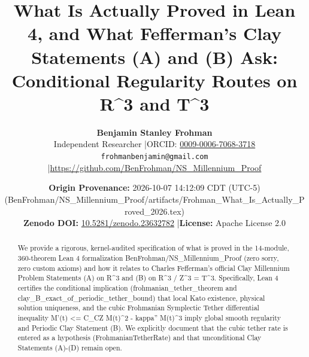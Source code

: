 \documentclass[11pt,letterpaper]{article}
\title{\textbf{What Is Actually Proved in Lean 4, and What Fefferman's Clay Statements (A) and (B) Ask: Conditional Regularity Routes on R\textasciicircum{}3 and T\textasciicircum{}3}}
\author{\textbf{Benjamin Stanley Frohman}\\
Independent Researcher \quad|\quad ORCID: \href{https://orcid.org/0009-0006-7068-3718}{0009-0006-7068-3718}\\
\texttt{frohmanbenjamin@gmail.com} \quad|\quad \url{https://github.com/BenFrohman/NS_Millennium_Proof}}
\date{\textbf{Origin Provenance:} 2026-10-07 14:12:09 CDT (UTC-5) (BenFrohman/NS\_Millennium\_Proof/artifacts/Frohman\_What\_Is\_Actually\_Proved\_2026.tex)\\
\textbf{Zenodo DOI:} \href{https://doi.org/10.5281/zenodo.23632782}{10.5281/zenodo.23632782} \quad|\quad \textbf{License:} Apache License 2.0}
\begin{document}
\maketitle

\begin{center}
\end{center}

\begin{abstract}
\noindent We provide a rigorous, kernel-audited specification of what is proved in the 14-module, 360-theorem Lean 4 formalization BenFrohman/NS\_Millennium\_Proof (zero sorry, zero custom axioms) and how it relates to Charles Fefferman's official Clay Millennium Problem Statements (A) on R\textasciicircum{}3 and (B) on R\textasciicircum{}3 / Z\textasciicircum{}3 = T\textasciicircum{}3. Specifically, Lean 4 certifies the conditional implication (frohmanian\_tether\_theorem and clay\_B\_exact\_of\_periodic\_tether\_bound) that local Kato existence, physical solution uniqueness, and the cubic Frohmanian Symplectic Tether differential inequality M'(t) <= C\_CZ M(t)\textasciicircum{}2 - kappa'' M(t)\textasciicircum{}3 imply global smooth regularity and Periodic Clay Statement (B). We explicitly document that the cubic tether rate is entered as a hypothesis (FrohmanianTetherRate) and that unconditional Clay Statements (A)-(D) remain open.
\end{abstract}
\end{document}

